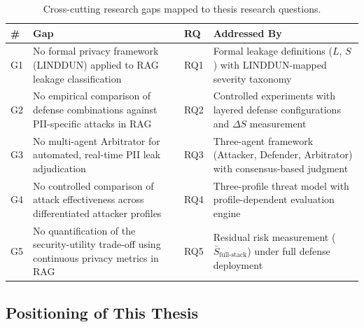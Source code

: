 \documentclass[12pt, a4paper]{report}
\begin{document}
\begin{table}[H]
\centering
\caption{Cross-cutting research gaps mapped to thesis research questions.}
\label{tab:gap-matrix}
\footnotesize
{}
\begin{tabular}{C{0.5cm} L{6.5cm} C{1.2cm} L{4.5cm}}
\toprule
{}
\color{white}\textbf{\#} &
\color{white}\textbf{Gap} &
\color{white}\textbf{RQ} &
\color{white}\textbf{Addressed By} \\
\midrule
G1 & No formal privacy framework (LINDDUN) applied to RAG leakage classification & RQ1 & Formal leakage definitions ($L$, $S$) with LINDDUN-mapped severity taxonomy \\
G2 & No empirical comparison of defense combinations against PII-specific attacks in RAG & RQ2 & Controlled experiments with layered defense configurations and $\Delta S$ measurement \\
G3 & No multi-agent Arbitrator for automated, real-time PII leak adjudication & RQ3 & Three-agent framework (Attacker, Defender, Arbitrator) with consensus-based judgment \\
G4 & No controlled comparison of attack effectiveness across differentiated attacker profiles & RQ4 & Three-profile threat model with profile-dependent evaluation engine \\
G5 & No quantification of the security-utility trade-off using continuous privacy metrics in RAG & RQ5 & Residual risk measurement ($\bar{S}_{\text{full-stack}}$) under full defense deployment \\
\bottomrule
\end{tabular}
\end{table}

\subsection{Positioning of This Thesis}
\end{document}
